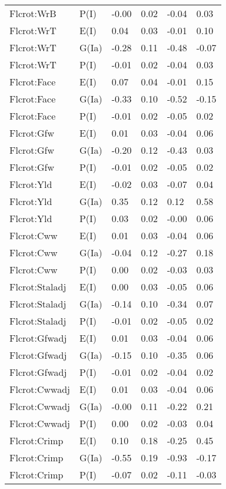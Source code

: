 \begin{center}
\begin{longtable}{|p{1.1in}|p{0.7in}|p{0.7in}|p{0.6in}|p{0.6in}|p{0.6in}|}
  Flcrot:WrB & P(I) & -0.00 & 0.02 & -0.04 & 0.03 \\ 
  Flcrot:WrT & E(I) & 0.04 & 0.03 & -0.01 & 0.10 \\ 
  Flcrot:WrT & G(Ia) & -0.28 & 0.11 & -0.48 & -0.07 \\ 
  Flcrot:WrT & P(I) & -0.01 & 0.02 & -0.04 & 0.03 \\ 
  Flcrot:Face & E(I) & 0.07 & 0.04 & -0.01 & 0.15 \\ 
  Flcrot:Face & G(Ia) & -0.33 & 0.10 & -0.52 & -0.15 \\ 
  Flcrot:Face & P(I) & -0.01 & 0.02 & -0.05 & 0.02 \\ 
  Flcrot:Gfw & E(I) & 0.01 & 0.03 & -0.04 & 0.06 \\ 
  Flcrot:Gfw & G(Ia) & -0.20 & 0.12 & -0.43 & 0.03 \\ 
  Flcrot:Gfw & P(I) & -0.01 & 0.02 & -0.05 & 0.02 \\ 
  Flcrot:Yld & E(I) & -0.02 & 0.03 & -0.07 & 0.04 \\ 
  Flcrot:Yld & G(Ia) & 0.35 & 0.12 & 0.12 & 0.58 \\ 
  Flcrot:Yld & P(I) & 0.03 & 0.02 & -0.00 & 0.06 \\ 
  Flcrot:Cww & E(I) & 0.01 & 0.03 & -0.04 & 0.06 \\ 
  Flcrot:Cww & G(Ia) & -0.04 & 0.12 & -0.27 & 0.18 \\ 
  Flcrot:Cww & P(I) & 0.00 & 0.02 & -0.03 & 0.03 \\ 
  Flcrot:Staladj & E(I) & 0.00 & 0.03 & -0.05 & 0.06 \\ 
  Flcrot:Staladj & G(Ia) & -0.14 & 0.10 & -0.34 & 0.07 \\ 
  Flcrot:Staladj & P(I) & -0.01 & 0.02 & -0.05 & 0.02 \\ 
  Flcrot:Gfwadj & E(I) & 0.01 & 0.03 & -0.04 & 0.06 \\ 
  Flcrot:Gfwadj & G(Ia) & -0.15 & 0.10 & -0.35 & 0.06 \\ 
  Flcrot:Gfwadj & P(I) & -0.01 & 0.02 & -0.04 & 0.02 \\ 
  Flcrot:Cwwadj & E(I) & 0.01 & 0.03 & -0.04 & 0.06 \\ 
  Flcrot:Cwwadj & G(Ia) & -0.00 & 0.11 & -0.22 & 0.21 \\ 
  Flcrot:Cwwadj & P(I) & 0.00 & 0.02 & -0.03 & 0.04 \\ 
  Flcrot:Crimp & E(I) & 0.10 & 0.18 & -0.25 & 0.45 \\ 
  Flcrot:Crimp & G(Ia) & -0.55 & 0.19 & -0.93 & -0.17 \\ 
  Flcrot:Crimp & P(I) & -0.07 & 0.02 & -0.11 & -0.03 \\ 

\end{longtable}
\end{center}
